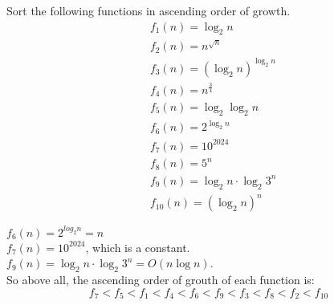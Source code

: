 \problem{}

Sort the following functions in ascending order of growth.
\begin{align}
    &f_1(n)=\log_2{n} \\
    &f_2(n)=n^{\sqrt{n}} \\
    &f_3(n)=(\log_2{n})^{\log_2{n}} \\
    &f_4(n)=n^{\frac{3}{4}}  \\
    &f_5(n)=\log_2{\log_2{n}} \\
    &f_6(n)=2^{\log_2{n}}  \\
    &f_7(n)=10^{2024}  \\
    &f_8(n)=5^n \\
    &f_9(n)=\log_2{n}\cdot\log_2{3^n} \\
    &f_{10}(n)=(\log_2{n})^n
\end{align}

\solution{}

$f_6(n)=2^{log_2{n}}=n$\\
$f_7(n)=10^{2024}$, which is a constant.\\
$f_9(n)=\log_2{n}\cdot\log_2{3^n}=O(n\log n)$.\\

So above all, the ascending order of grouth of each function is:
$$f_7<f_5<f_1<f_4<f_6<f_9<f_3<f_8<f_2<f_{10}$$

\newpage